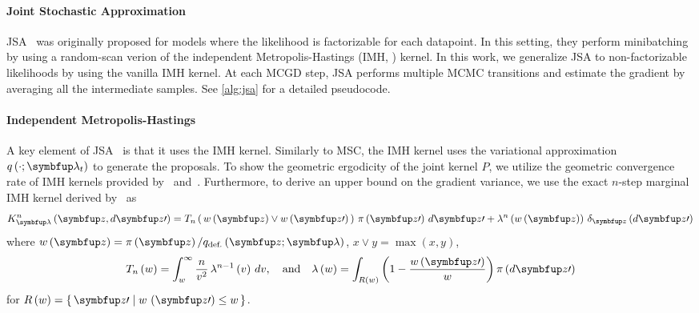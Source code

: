 \vspace{-0.05in}
\paragraph{Joint Stochastic Approximation}
JSA~\citep{pmlr-v124-ou20a} was originally proposed for models where the likelihood is factorizable for each datapoint.
In this setting, they perform minibatching by using a random-scan verion of the independent Metropolis-Hastings (IMH, \citealt{hastings_monte_1970,robert_monte_2004}) kernel.
In this work, we generalize JSA to non-factorizable likelihoods by using the vanilla IMH kernel.
At each MCGD step, JSA performs multiple MCMC transitions and estimate the gradient by averaging all the intermediate samples.
See \cref{alg:jsa} for a detailed pseudocode.

\vspace{-0.05in}
\paragraph{Independent Metropolis-Hastings}
A key element of JSA~\citep{pmlr-v124-ou20a} is that it uses the IMH kernel.
Similarly to MSC, the IMH kernel uses the variational approximation \(q\left(\cdot; \vlambda_t\right)\) to generate the proposals.
To show the geometric ergodicity of the joint kernel \(P\), we utilize the geometric convergence rate of IMH kernels provided by~\citet[Theorem 2.1]{10.2307/2242610} and~\citet{wang_exact_2020}.
Furthermore, to derive an upper bound on the gradient variance, we use the exact \(n\)-step marginal IMH kernel derived by~\citet{Smith96exacttransition} as
{%
  \begin{align}
  K^n_{\vlambda}\left(\vz, d\vz\prime\right) 
  = T_n\left(\, w\left(\vz\right) \vee w\left(\vz\prime\right)\,\right) \, \pi\left(\vz\prime\right) \, d\vz\prime
  + \lambda^n\left(w\left(\vz\right)\right) \, \delta_{\vz}\left(d\vz\prime\right)
  \label{eq:imh_exact_kernel}
  \end{align}
}%
where {\(w\left(\vz\right) = \pi\left(\vz\right)/q_{\text{def.}}\left(\vz; \vlambda\right)\), \(x \vee y = \max\left(x, y\right)\)},
{\small
  \begin{align}
    T_n\left(w\right)      = \int_w^{\infty}
    \frac{n}{v^2}
    \, \lambda^{n-1}\left(v\right)\,dv,
    \quad\text{and}\quad
    \lambda\left(w\right) =
    \int_{R\left(w\right)}
    \left( 1 - \frac{w\left(\vz\prime\right)}{w}  \right)
    \pi\left(d\vz\prime\right)\label{eq:T_lambda}
  \end{align}
}
for {\(R\left(w\right) = \{\, \vz\prime \mid w\,\left(\vz\prime\right) \leq w \,\}\)}.
%


%

